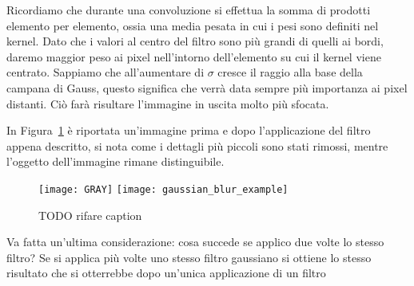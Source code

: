 Ricordiamo che durante una convoluzione si effettua la somma di prodotti elemento per elemento, ossia una media pesata in cui i pesi sono definiti nel kernel.
Dato che i valori al centro del filtro sono più grandi di quelli ai bordi, daremo maggior peso ai pixel nell'intorno dell'elemento su cui il kernel viene centrato.
Sappiamo che all'aumentare di $\sigma$ cresce il raggio alla base della campana di Gauss, questo significa che verrà data sempre più importanza ai pixel distanti.
Ciò farà risultare l'immagine in uscita molto più sfocata.


In Figura~\ref{fig:gaussian_blur_example} è riportata un'immagine prima e dopo l'applicazione del filtro appena descritto, si nota come i dettagli più piccoli sono stati rimossi, mentre l'oggetto dell'immagine rimane distinguibile.

\begin{figure}[ht] %
  \begin{center}
    \texttt{[image: GRAY]}
    \texttt{[image: gaussian\_blur\_example]}
    \caption{TODO rifare caption}
    \label{fig:gaussian_blur_example}
  \end{center}
\end{figure}

Va fatta un'ultima considerazione: cosa succede se applico due volte lo stesso filtro?
Se si applica più volte uno stesso filtro gaussiano si ottiene lo stesso risultato che si otterrebbe dopo un'unica applicazione di un filtro 





